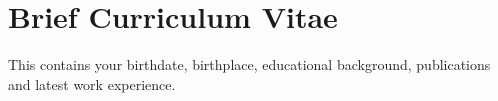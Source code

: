 \chapter*{Brief Curriculum Vitae}

This contains your birthdate, birthplace, educational background, publications and latest work experience.